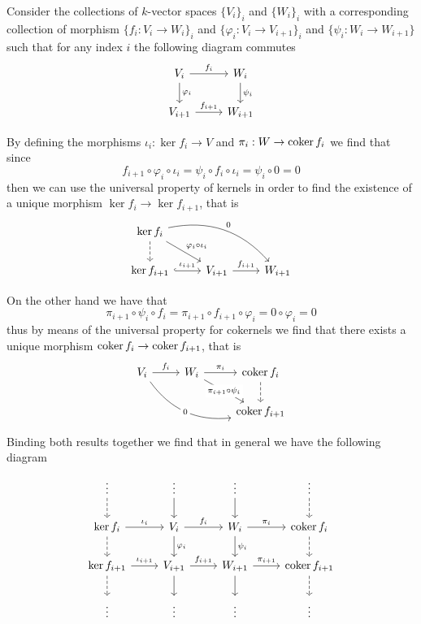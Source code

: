 Consider the collections of \(k\)-vector spaces \(\{V_i\}_i\) and \(\{W_i\}_i\)
with a corresponding collection of morphism \(\{f_i : V_i \to W_i\}_i\) and
\(\{\varphi_i : V_i \to V_{i+1}\}_i\) and \(\{\psi_i : W_i \to W_{i+1}\}\) such
that for any index \(i\) the following diagram commutes
\[
  \begin{tikzcd}
    V_i \rar["f_i"] \dar["\varphi_i"] &W_i \dar["\psi_i"]
    \\
    V_{i+1} \rar["f_{i+1}"] &W_{i+1}
  \end{tikzcd}
\]

By defining the morphisms \(\iota_i : \ker f_i \to V\) and \(\pi_i : W \to
\operatorname{coker} f_i\) we find that since
\[
  f_{i+1} \circ \varphi_i \circ \iota_i
  = \psi_i \circ f_i \circ \iota_i
  = \psi_i \circ 0 = 0
\]
then we can use the universal property of kernels in order to find the existence
of a unique morphism \(\ker f_i \to \ker f_{i+1}\), that is
\[
  \begin{tikzcd}
    \ker f_i \dar[dashed] \ar[dr, "\varphi_i \circ \iota_i"] \ar[drr, bend
    left, "0"] & &
    \\
    \ker f_{i+1} \rar[hook, "\iota_{i+1}"] &V_{i+1} \rar["f_{i+1}"] &W_{i+1}
  \end{tikzcd}
\]

On the other hand we have that
\[
  \pi_{i+1} \circ \psi_i \circ f_i
  = \pi_{i+1} \circ f_{i+1} \circ \varphi_i
  = 0 \circ \varphi_i = 0
\]
thus by means of the universal property for cokernels we find that there exists
a unique morphism \(\operatorname{coker} f_i \to \operatorname{coker} f_{i+1}\), that is
\[
  \begin{tikzcd}
    V_i \rar["f_i"] \ar[drr, bend right, "0" description]
      &W_i \rar["\pi_i"] \ar[dr, "\pi_{i+1} \circ \psi_i" description]
    &\coker f_i \dar[dashed]
    \\
    & &\coker f_{i+1}
  \end{tikzcd}
\]

Binding both results together we find that in general we have the following
diagram
\[
  \begin{tikzcd}
    \vdots \dar[dashed] &\vdots \dar &\vdots \dar &\vdots \dar[dashed]
    \\
    \ker f_i \rar["\iota_i"] \dar[dashed]
      &V_i \rar["f_i"] \dar["\varphi_i"]
    &W_i \dar["\psi_i"] \rar["\pi_i"]
      &\coker f_i \dar[dashed]
    \\
    \ker f_{i+1} \rar["\iota_{i+1}"] \dar[dashed]
      &V_{i+1} \rar["f_{i+1}"] \dar
    &W_{i+1} \rar["\pi_{i+1}"] \dar
      &\coker f_{i+1} \dar[dashed]
    \\
    \vdots &\vdots &\vdots &\vdots
  \end{tikzcd}
\]

